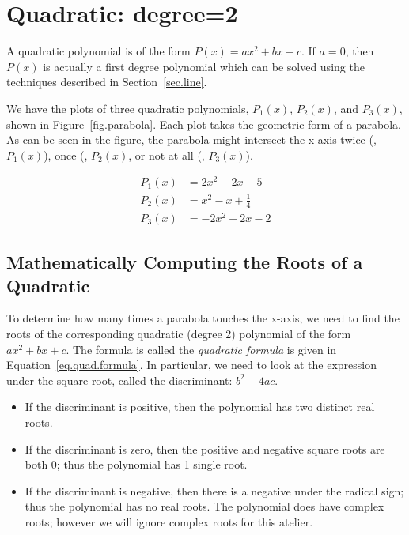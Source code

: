 \section{Quadratic: degree=2}
\label{sec.quadratic}



A quadratic polynomial is of the form $P(x)=a x^2 + b x + c$.  If
$a=0$, then $P(x)$ is actually a first degree polynomial which can be
solved using the techniques described in Section~\ref{sec.line}.

We have the plots of three quadratic polynomials, $P_1(x)$, $P_2(x)$,
and $P_3(x)$, shown in Figure~\ref{fig.parabola}.  Each plot takes the
geometric form of a parabola.  As can be seen in the figure, the
parabola might intersect the x-axis twice (\eg, $P_1(x)$), once (\eg,
$P_2(x)$, or not at all (\eg, $P_3(x)$).

\begin{align*}
  P_1(x) &= 2x^2 - 2 x - 5\\
  P_2(x) &= x^2 -x + \frac{1}{4}\\
  P_3(x) &=  -2x^2 + 2x -2
\end{align*}


\subsection{Mathematically Computing the Roots of a Quadratic}

To determine how many times a parabola touches the x-axis, we need to
find the roots of the corresponding quadratic (degree 2) polynomial of
the form $a x^2 + b x + c$.  The formula is called the \emph{quadratic
formula} is given in Equation~\eqref{eq.quad.formula}.  In particular,
we need to look at the expression under the square root, called the
discriminant: $b^2 - 4a c$.
\begin{itemize}
\item If the discriminant is positive, then the polynomial has two
  distinct real roots.
\item If the discriminant is zero, then the positive and negative
  square roots are both 0; thus the polynomial has 1 single root.
\item If the discriminant is negative, then there is a negative under
  the radical sign; thus the polynomial has no real roots.  The
  polynomial does have complex roots; however we will ignore complex
  roots for this atelier.
\end{itemize}


